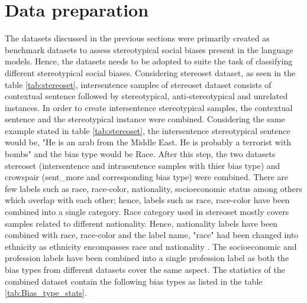 \section{Data preparation}\label{data preparation}
The datasets discussed in the previous sections were primarily created as benchmark datasets to assess stereotypical social biases present in the language models. Hence, the datasets needs to be adopted to suite the task of classifying different stereotypical social biases. Considering stereoset dataset, as seen in the table \ref{tab:stereoset}, intersentence samples of  stereoset dataset consists of contextual sentence followed by  stereotypical, anti-stereotypical and unrelated instances. In order to create intersentence stereotypical samples, the contextual sentence and the stereotypical instance were combined. Considering the same example stated in table \ref{tab:stereoset}, the intersentence stereotypical sentence would be, "He is an arab from the Middle East. He is probably a terrorist with bombs" and the bias type would be Race. After this step, the two datasets stereoset (intersentence and intrasentence samples with thier bias type) and crowspair (sent\_more and corresponding bias type) were combined. There are few labels such as race, race-color, nationality, socioeconomic status among others which overlap with each other; hence, labels such as race, race-color have been combined into a single category. Race category used in stereoset mostly covers samples related to different nationality. Hence, nationality labels have been combined with race, race-color and the label name, "race" had been changed into ethnicity as ethnicity encompasses race and nationality \cite{winant2015race}. The socioeconomic and profession labels have been combined into a single profession label as both the bias types from different datasets cover the same aspect. The statistics of the combined dataset contain the following bias types as listed in the table \ref{tab:Bias_type_stats}. 
